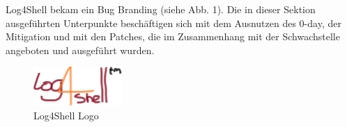 
Log4Shell bekam ein Bug Branding (siehe Abb. 1). Die in dieser Sektion ausgeführten Unterpunkte beschäftigen
sich mit dem Ausnutzen des 0-day, der Mitigation und mit den Patches, die im Zusammenhang mit der Schwachstelle angeboten
und ausgeführt wurden.
\begin{figure}[!htb]
    \begin{center}
        \includegraphics[width=0.3\textwidth]{images/log4shell-logo}
    \end{center}
    \caption{Log4Shell Logo}
\end{figure}

